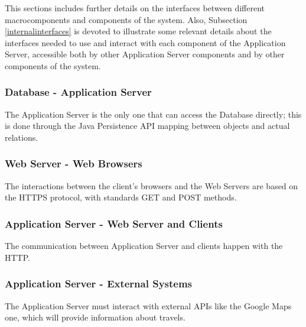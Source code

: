 This sections includes further details on the interfaces between different macrocomponents and components of the system. Also, Subsection \ref{internalinterfaces} is devoted to illustrate some relevant details about the interfaces needed to use and interact with each component of the Application Server, accessible both by other Application Server components and by other components of the system.

\subsubsection{Database - Application Server}
The Application Server is the only one that can access the Database directly; this is done through the Java Persistence API mapping between objects and actual relations.

\subsubsection{Web Server - Web Browsers}
The interactions between the client's browsers and the Web Servers are based on the HTTPS protocol, with standards GET and POST methods.

\subsubsection{Application Server - Web Server and Clients}
The communication between Application Server and clients happen with the HTTP.

\subsubsection{Application Server - External Systems}
The Application Server must interact with external APIs like the Google Maps one, which will provide information about travels.